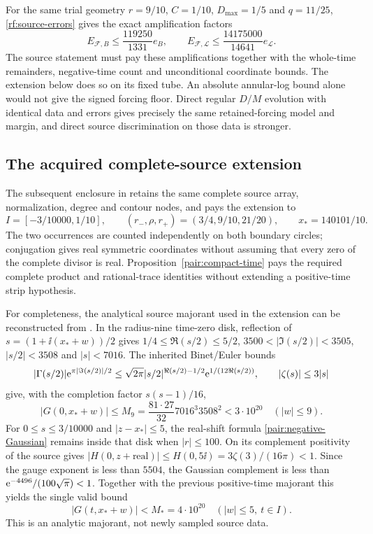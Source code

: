 For the same trial geometry $r=9/10$, $C=1/10$, $D_{\max}=1/5$ and
$q=11/25$, \eqref{rf:source-errors} gives the exact amplification factors
\[
 E_{\mathcal F,B}\le\frac{119250}{1331}e_B,
 \qquad
 E_{\mathcal F,\mathcal L}\le\frac{14175000}{14641}e_{\mathcal L}.
\]
The source statement must pay these amplifications together with the
whole-time remainders, negative-time count and unconditional coordinate
bounds. The extension below does so on its fixed tube. An absolute
annular-log bound alone would not give the signed forcing floor.
Direct regular $D/M$ evolution with identical data and errors gives
precisely the same retained-forcing model and margin, and direct
source discrimination on those data is stronger.

\subsection{The acquired complete-source extension}
\label{supp:extended-source}

The subsequent enclosure in \cite{BakerCM39,BakerCMReview35} retains
the same complete source array, normalization, degree and contour nodes,
and pays the extension to
\[
 I=[-3/10000,1/10],\qquad
 (r_-,\rho,r_+)=(3/4,9/10,21/20),\qquad x_*=140101/10.
\]
The two occurrences are counted independently on both boundary circles;
conjugation gives real symmetric coordinates without assuming that every
zero of the complete divisor is real. Proposition~\ref{pair:compact-time}
pays the required complete product and rational-trace identities without
extending a positive-time strip hypothesis.

For completeness, the analytical source majorant used in the extension
can be reconstructed from \cite{BakerGT12}. In the radius-nine time-zero
disk, reflection of $s=(1+\ii(x_*+w))/2$ gives
$1/4\le\Re(s/2)\le5/2$, $3500<|\Im(s/2)|<3505$,
$|s/2|<3508$ and $|s|<7016$. The inherited Binet/Euler bounds
\[
 |\Gamma(s/2)|\mathrm e^{\pi|\Im(s/2)|/2}
 \le\sqrt{2\pi}|s/2|^{\Re(s/2)-1/2}\mathrm e^{1/(12\Re(s/2))},
 \qquad |\zeta(s)|\le3|s|
\]
give, with the completion factor $s(s-1)/16$,
\[
 |G(0,x_*+w)|\le M_9=\frac{81\cdot27}{32}7016^3 3508^2
                    <3\cdot10^{20}\quad(|w|\le9).
\]
For $0\le s\le3/10000$ and $|z-x_*|\le5$, the real-shift
formula \eqref{pair:negative-Gaussian} remains inside that disk when
$|r|\le100$. On its complement positivity of the source gives
$|H(0,z+\text{real})|\le H(0,5\ii)=3\zeta(3)/(16\pi)<1$.
Since the gauge exponent is less than $5504$, the Gaussian complement
is less than $\mathrm e^{-4496}/(100\sqrt\pi)<1$. Together with the
previous positive-time majorant this yields the single valid bound
\[
 |G(t,x_*+w)|<M_*=4\cdot10^{20}\quad(|w|\le5,\ t\in I).
\]
This is an analytic majorant, not newly sampled source data.


